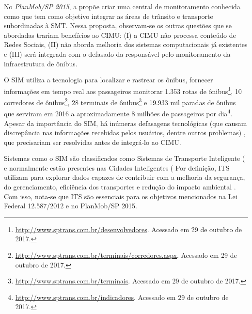 \documentclass[
	12pt,				%
	oneside,			%
	a4paper,			%
	english,			%
	brazil				%
	]{abntex2ppgsi}
\begin{document}
No \textit{PlanMob/SP 2015}, a  propõe criar uma central de monitoramento conhecida como  que tem como objetivo integrar as áreas de trânsito e transporte subordinadas à SMT. Nessa proposta, observam-se os outras questões que se abordadas trariam benefícios ao CIMU: (I) a CIMU não processa conteúdo de Redes Sociais, (II) não aborda melhoria dos sistemas computacionais já existentes e (III) será integrada com o defasado \cite{consulo2016evaluation}  da  responsável pelo monitoramento da infraestrutura de ônibus. 

O SIM utiliza a tecnologia  para localizar e rastrear os ônibus, fornecer informações em tempo real aos passageiros  monitorar 1.353 rotas de ônibus\footnote{\label{gtfsSptrans}\url{http://www.sptrans.com.br/desenvolvedores}. Acessado em 29 de outubro de 2017.}, 10 corredores de ônibus\footnote{\url{http://www.sptrans.com.br/terminais/corredores.aspx}. Acessado em 29 de outubro de 2017.}, 28 terminais de ônibus\footnote{\url{http://www.sptrans.com.br/terminais}. Acessado em 29 de outubro de 2017.} e 19.933 mil paradas de ônibus que serviram em 2016 a aproximadamente 8 milhões de passageiros por dia\footnote{\url{http://www.sptrans.com.br/indicadores}. Acessado em 29 de outubro de 2017.}. Apesar da importância do SIM, há inúmeras defasagens tecnológicas (que causam discrepância nas informações recebidas pelos usuários, dentre outros problemas) \cite{consulo2016evaluation}, que precisariam ser resolvidas antes de integrá-lo ao CIMU.
 
Sistemas como o SIM são classificados como Sistemas de Transporte Inteligente ( e normalmente estão presentes nas Cidades Inteligentes ( Por definição, ITS utilizam  para explorar dados capazes de contribuir com a melhoria da segurança, do gerenciamento, eficiência dos transportes e redução do impacto ambiental \cite{Anttiroiko2013}. Com isso, nota-se que ITS são essenciais para os objetivos mencionados na Lei Federal 12.587/2012 e no PlanMob/SP 2015.  
\end{document}
